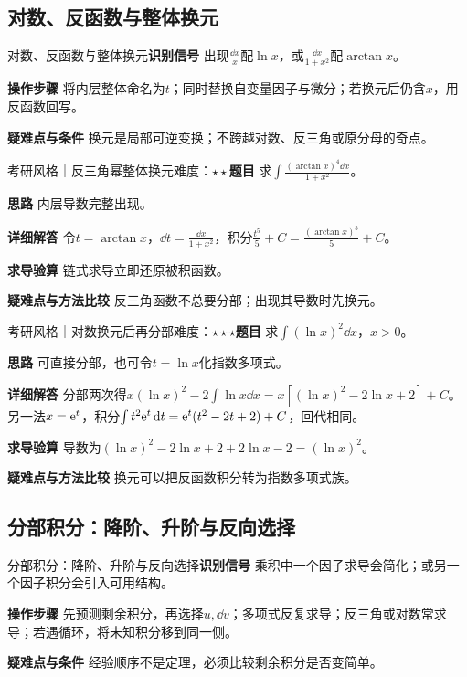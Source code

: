 \subsection{对数、反函数与整体换元}\label{ic:indefinite_classical_complete:logsub}\begin{method}{对数、反函数与整体换元}\textbf{识别信号} 出现$\frac{\dd x}{x}$配$\ln x$，或$\frac{\dd x}{1+x^2}$配$\arctan x$。\par \textbf{操作步骤} 将内层整体命名为$t$；同时替换自变量因子与微分；若换元后仍含$x$，用反函数回写。\par \textbf{疑难点与条件} 换元是局部可逆变换；不跨越对数、反三角或原分母的奇点。\end{method}

\begin{example}{考研风格｜反三角幂整体换元}{难度：$\star\star$}\label{ic:ex:indefinite_classical_complete:atanpower}\textbf{题目} 求$\int\frac{(\arctan x)^4\dd x}{1+x^2}$。\par \textbf{思路} 内层导数完整出现。\par \textbf{详细解答} 令$t=\arctan x$，$\dd t=\frac{\dd x}{1+x^2}$，积分$\frac{t^5}{5}+C=\frac{(\arctan x)^5}{5}+C$。\par \textbf{求导验算} 链式求导立即还原被积函数。\par \textbf{疑难点与方法比较} 反三角函数不总要分部；出现其导数时先换元。\end{example}

\begin{example}{考研风格｜对数换元后再分部}{难度：$\star\star\star$}\label{ic:ex:indefinite_classical_complete:xlog}\textbf{题目} 求$\int(\ln x)^2\dd x$，$x>0$。\par \textbf{思路} 可直接分部，也可令$t=\ln x$化指数多项式。\par \textbf{详细解答} 分部两次得$x(\ln x)^2-2\int\ln x\dd x=x[(\ln x)^2-2\ln x+2]+C$。另一法$x=\mathrm{e}^t$，积分$\int t^2\mathrm{e}^t\mathop{}\!\mathrm{d} t=\mathrm{e}^t(t^2-2t+2)+C$，回代相同。\par \textbf{求导验算} 导数为$(\ln x)^2-2\ln x+2+2\ln x-2=(\ln x)^2$。\par \textbf{疑难点与方法比较} 换元可以把反函数积分转为指数多项式族。\end{example}

\subsection{分部积分：降阶、升阶与反向选择}\label{ic:indefinite_classical_complete:parts}\begin{method}{分部积分：降阶、升阶与反向选择}\textbf{识别信号} 乘积中一个因子求导会简化；或另一个因子积分会引入可用结构。\par \textbf{操作步骤} 先预测剩余积分，再选择$u,\dd v$；多项式反复求导；反三角或对数常求导；若遇循环，将未知积分移到同一侧。\par \textbf{疑难点与条件} 经验顺序不是定理，必须比较剩余积分是否变简单。\end{method}

